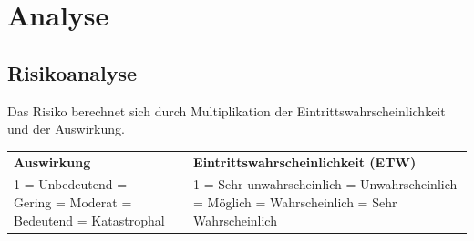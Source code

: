 \newpage
\section{Analyse}
\subsection{Risikoanalyse}
Das Risiko berechnet sich durch Multiplikation der Eintrittswahrscheinlichkeit und der Auswirkung. \\

\begin{table}[H]
  \centering
  \settowidth{}
  \setlength\extrarowheight{2pt}
  \begin{tabulary}{1.0\textwidth}{LCL}
    \textbf{Auswirkung} & &
    \textbf{Eintrittswahrscheinlichkeit (ETW)} \\
    1 = Unbedeutend = Gering  = Moderat  = Bedeutend  = Katastrophal && 1 = Sehr unwahrscheinlich = Unwahrscheinlich = Möglich = Wahrscheinlich = Sehr Wahrscheinlich\\
  \end{tabulary}
\end{table}

